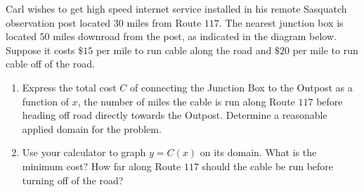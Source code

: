 \documentclass[12pt]{ximera}
\begin{document}
\begin{example} \label{SasquatchCable} Carl wishes to get high speed internet service installed in his remote Sasquatch observation post located $30$ miles from Route $117$. The nearest junction box is located $50$ miles downroad from the post, as indicated in the diagram below.  Suppose it costs $\$ 15$ per mile to run cable along the road and $\$ 20$ per mile to run cable off of the road.

\begin{center}

















\end{center}

\begin{enumerate}

\item  Express the total cost $C$ of connecting the Junction Box to the Outpost as a function of $x$, the number of miles the cable is run along Route $117$ before heading off road directly towards the Outpost.  Determine a reasonable applied domain for the problem.

\item  Use your calculator to graph $y=C(x)$ on its domain.  What is the minimum cost?  How far along Route $117$ should the cable be run before turning off of the road?


\end{enumerate}
\end{example}
\end{document}
